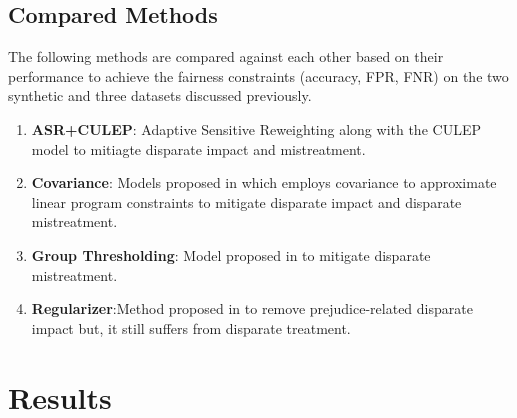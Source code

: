 \documentclass[runningheads]{llncs}
\begin{document}
\subsection{Compared Methods}
The following methods are compared against each other based on their performance to achieve the fairness constraints (accuracy, FPR, FNR) on the two synthetic and three datasets discussed previously.
\begin{enumerate}
\item \textbf{ASR+CULEP}: Adaptive Sensitive Reweighting along with the CULEP model to mitiagte disparate impact and mistreatment.
\item \textbf{Covariance}: Models proposed in \cite{zafar2015fairness} \cite{zafar2017fairness} which employs covariance to approximate linear program constraints to mitigate disparate impact and disparate mistreatment.
\item \textbf{Group Thresholding}: Model proposed in \cite{hardt2016equality} to mitigate disparate mistreatment.
\item \textbf{Regularizer}:Method proposed in \cite{kamishima2012fairness} to remove prejudice-related disparate impact but, it still suffers from disparate treatment.
\end{enumerate}
\section{Results}
\end{document}
